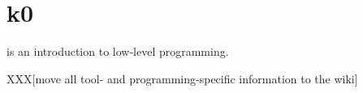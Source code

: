 %
%
%
%
%
%

%
%

\chapter{k0}
\label{chapter:k0}

 is an introduction to low-level programming.

\newpage

%
%

XXX[move all tool- and programming-specific information to the wiki]
